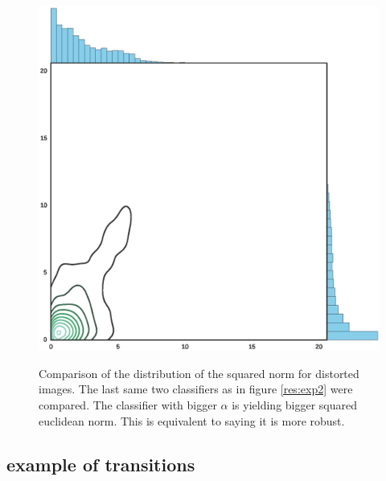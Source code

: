 \documentclass{article} %
\begin{document}
\begin{figure}[h!]
\begin{center}
\includegraphics[scale=0.6]{figs/sup_2}
\label{exp:sup_2}
\caption{\small Comparison of the distribution of the squared norm for distorted images. The last same two classifiers as in figure \ref{res:exp2} were compared.
The classifier with bigger $\alpha$ is yielding bigger squared euclidean norm.
This is equivalent to saying it is more robust.}
\end{center}
\end{figure}

\null
\vfill
\raggedbottom
\pagebreak
\newpage

\subsection{example of transitions}
\end{document}

